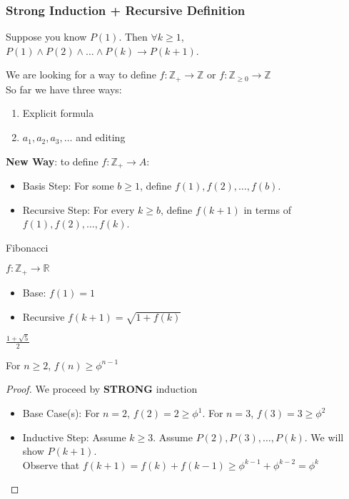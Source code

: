 \documentclass[11pt]{scrartcl}
\begin{document}
\subsubsection{Strong Induction + Recursive Definition}
\begin{definition}
    Suppose you know $P(1)$.  Then $\forall k \geq 1$, $P(1) \wedge P(2) \wedge \dots \wedge P(k) \rightarrow P(k+1)$.
\end{definition}
\noindent
We are looking for a way to define $f:\mathbb{Z}_+ \rightarrow \mathbb{Z}$ or $f:\mathbb{Z}_{\geq 0} \rightarrow \mathbb{Z}$\\
So far we have three ways: \begin{enumerate}
    \item Explicit formula
    \item $a_1, a_2, a_3, \dots $ and editing
\end{enumerate}
\textbf{New Way}: to define $f: \mathbb{Z}_+ \rightarrow A$:\begin{itemize}
    \item Basis Step: For some $b \geq 1$, define $f(1), f(2), \dots, f(b)$. 
    \item Recursive Step: For every $k \geq b$, define $f(k + 1)$ in terms of $f(1), f(2), \dots, f(k)$.
\end{itemize}
\begin{example}
    Fibonacci
\end{example}
\begin{example}
    $f: \mathbb{Z}_+ \rightarrow \mathbb{R}$
    \begin{itemize}
        \item Base: $f(1) = 1$
        \item Recursive $f(k+1) = \sqrt{1+f(k)}$
    \end{itemize}
\end{example}
\begin{definition}
    $\frac{1+\sqrt{5}}{2}$
\end{definition}
\begin{theorem}
    For $n\geq 2$, $f(n) \geq \phi^{n-1}$
\end{theorem}
\begin{proof}
    We proceed by \textbf{STRONG} induction\begin{itemize}
        \item Base Case(s): For $n=2$, $f(2) = 2 \geq \phi^1$.  For $n = 3$, $f(3) = 3 \geq \phi^2$
        \item Inductive Step: Assume $k \geq 3$. Assume $P(2), P(3), \dots, P(k)$.  We will show $P(k+1)$.\\
        Observe that $f(k+1) = f(k) + f(k-1) \geq \phi^{k-1} + \phi^{k-2} = \phi^k$
    \end{itemize}
\end{proof}
\noindent
\Line
\\
\end{document}
